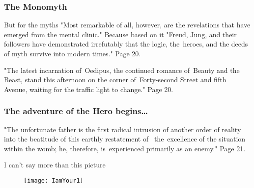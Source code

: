 \documentclass[10pt,t]{beamer}
\begin{document}
\begin{frame}
  \frametitle{The Monomyth}

  \begin{block}{But for the myths}
    "Most remarkable of all, however, are the revelations that have
    emerged from the mental clinic." Because based on it "Freud, Jung,
    and their followers have demonstrated irrefutably that the logic,
    the~heroes, and the deeds of myth survive into modern times." Page
    20.
  \end{block}
  \pause

  \begin{block}{}
    "The latest incarnation of~Oedipus, the continued romance
    of~Beauty and the Beast, stand this afternoon on the corner
    of~Forty-second Street and fifth Avenue, waiting for the traffic
    light to change." Page 20.
  \end{block}

  \begin{block}{I can only replay}
    \begin{figure}
      \centering \texttt{[image: Stroke]}
      \begin{captation}
      \end{figure}}
  \end{block}

\end{frame}



\begin{frame}
  \frametitle{The adventure of the Hero begins\ldots}

  \begin{block}{}
    "The unfortunate father is the first radical intrusion of another
    order of reality into the beatitude of this earthly restatement
    of~ the~excellence of the situation within the womb; he,
    therefore, is~experienced primarily as an enemy." Page 21.
  \end{block}
  \pause

  \begin{block}{I can't say more than this picture}
    \begin{figure}
      \centering \texttt{[image: IamYour1]}
    \end{figure}
  \end{block}

\end{frame}
\end{document}
